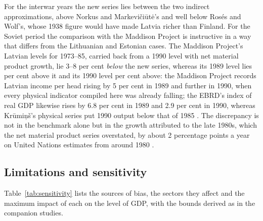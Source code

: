 

For the interwar years the new series lies between the two indirect approximations, above Norkus and Markevičiūtė's and well below Rosés and Wolf's, whose 1938 figure would have made Latvia richer than Finland. For the Soviet period the comparison with the Maddison Project is instructive in a way that differs from the Lithuanian and Estonian cases. The Maddison Project's Latvian levels for 1973--85, carried back from a 1990 level with net material product growth, lie 3--8 per cent \textit{below} the new series, whereas its 1989 level lies  per cent above it and its 1990 level  per cent above: the Maddison Project records Latvian income per head rising by 5 per cent in 1989 and further in 1990, when every physical indicator compiled here was already falling; the EBRD's index of real GDP likewise rises by 6.8 per cent in 1989 and 2.9 per cent in 1990, whereas Krūmiņš's physical series put 1990 output below that of 1985 \parencites[269]{kyn_1997_eastern}[348--50]{krumins_2017_gorbacova}. The discrepancy is not in the benchmark alone but in the growth attributed to the late 1980s, which the net material product series overstated, by about 2 percentage points a year on United Nations estimates from around 1980 \parencite[289]{years_of_dependence}.

\subsection{Limitations and sensitivity}

Table~\ref{tab:sensitivity} lists the sources of bias, the sectors they affect and the maximum impact of each on the level of GDP, with the bounds derived as in the companion studies.



